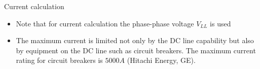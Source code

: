\providecommand{\acfig}[1]{ac-transmission/fig/#1}


\begin{frame}{Current calculation}
  \begin{itemize}
    \setlength{\itemsep}{0.5em}
    \item Note that for current calculation the phase-phase voltage $V_{LL}$ is used
    \item The maximum current is limited not only by the DC line capability but also by equipment on the DC line such as circuit breakers. 
    The maximum current rating for circuit breakers is $5000A$ (Hitachi Energy, GE).

  \end{itemize}
\end{frame}